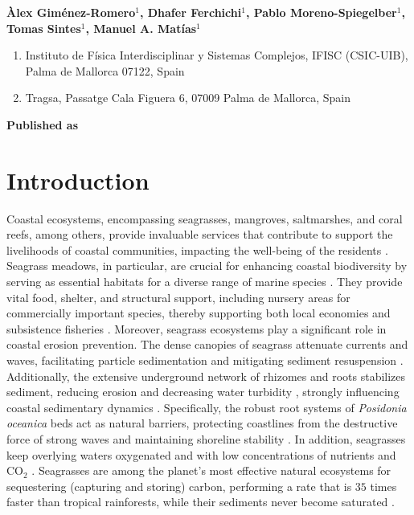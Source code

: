 \vspace{1cm}

\textbf{Àlex Giménez-Romero$^{1}$, Dhafer Ferchichi$^{1}$, Pablo
    Moreno-Spiegelber$^{1}$, Tomas Sintes$^{1}$,  Manuel A. Matías$^{1}$}

\vspace{1cm}

\begin{enumerate}
    \small
    \item Instituto de Física Interdisciplinar y Sistemas Complejos, IFISC
          (CSIC-UIB), Palma de Mallorca 07122, Spain
    \item Tragsa, Passatge Cala Figuera 6, 07009 Palma de Mallorca, Spain
\end{enumerate}

\vspace{1cm}

\textbf{Published as}

\vspace{0.5cm}


\newpage
\section{Introduction}
Coastal ecosystems, encompassing seagrasses, mangroves, saltmarshes, and coral
reefs, among others, provide invaluable services that contribute to support the
livelihoods of coastal communities, impacting the well-being of the residents
\cite{MEA2005,IUCN2008}. Seagrass meadows, in particular, are crucial for
enhancing coastal biodiversity by serving as essential habitats for a diverse
range of marine species \cite{Beck2001}. They provide vital food, shelter, and
structural support, including nursery areas for commercially important species,
thereby supporting both local economies and subsistence fisheries
\cite{Heck2003}. Moreover, seagrass ecosystems play a significant role in
coastal erosion prevention. The dense canopies of seagrass attenuate currents
and waves, facilitating particle sedimentation and mitigating sediment
resuspension \cite{Granata2001,Koch2006,Bos2007,Gacia2001}. Additionally, the
extensive underground network of rhizomes and roots stabilizes sediment,
reducing erosion and decreasing water turbidity \cite{Madsen2001}, strongly
influencing coastal sedimentary dynamics \cite{Marba2002,vanderHeide2007}.
Specifically, the robust root systems of \textit{Posidonia oceanica} beds act
as natural barriers, protecting coastlines from the destructive force of strong
waves and maintaining shoreline stability
\cite{Fonseca1992,Sanchez-Gonzalez2011,vandeVijsel2023}. In addition,
seagrasses keep overlying
waters oxygenated and with low concentrations of nutrients and CO$_2$
\cite{DuarteChiscano1999}. Seagrasses are among the planet’s most effective
natural ecosystems for sequestering (capturing and storing) carbon, performing
a rate that is $35$ times faster than tropical rainforests, while their
sediments never become saturated \cite{Mcleod2011}.


